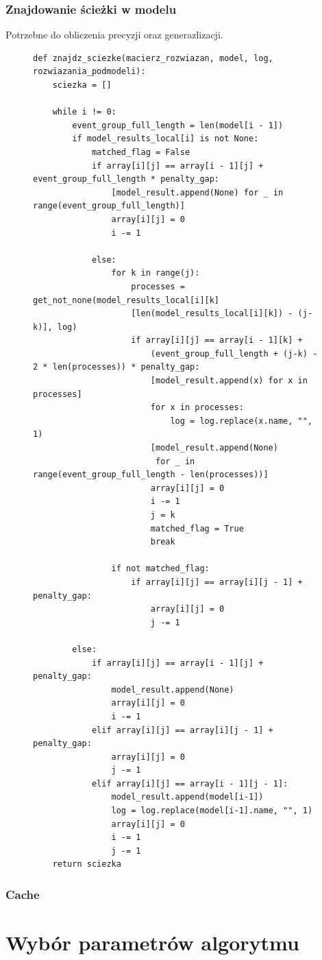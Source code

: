 \subsubsection{Znajdowanie ścieżki w modelu}
Potrzebne do obliczenia precyzji oraz generazlizacji.
\begin{figure}[!ht]
\lstset{caption=Znajdowanie ścieżki w modelu, captionpos=b}
\lstset{label=src:traceback, frame=single}
\begin{lstlisting}
def znajdz_sciezke(macierz_rozwiazan, model, log, rozwiazania_podmodeli):
    sciezka = []

    while i != 0:
        event_group_full_length = len(model[i - 1])
        if model_results_local[i] is not None:
            matched_flag = False
            if array[i][j] == array[i - 1][j] + event_group_full_length * penalty_gap:
                [model_result.append(None) for _ in range(event_group_full_length)]
                array[i][j] = 0
                i -= 1

            else:
                for k in range(j):
                    processes = get_not_none(model_results_local[i][k]
                    [len(model_results_local[i][k]) - (j-k)], log)
                    if array[i][j] == array[i - 1][k] + 
                    	(event_group_full_length + (j-k) - 2 * len(processes)) * penalty_gap:
                        [model_result.append(x) for x in processes]
                        for x in processes:
                            log = log.replace(x.name, "", 1)
                        [model_result.append(None) 
                         for _ in range(event_group_full_length - len(processes))]
                        array[i][j] = 0
                        i -= 1
                        j = k
                        matched_flag = True
                        break

                if not matched_flag:
                    if array[i][j] == array[i][j - 1] + penalty_gap:
                        array[i][j] = 0
                        j -= 1

        else:
            if array[i][j] == array[i - 1][j] + penalty_gap:
                model_result.append(None)
                array[i][j] = 0
                i -= 1
            elif array[i][j] == array[i][j - 1] + penalty_gap:
                array[i][j] = 0
                j -= 1
            elif array[i][j] == array[i - 1][j - 1]:
                model_result.append(model[i-1])
                log = log.replace(model[i-1].name, "", 1)
                array[i][j] = 0
                i -= 1
                j -= 1
    return sciezka
\end{lstlisting}
\end{figure}

\subsubsection{Cache}
\section{Wybór parametrów algorytmu}
